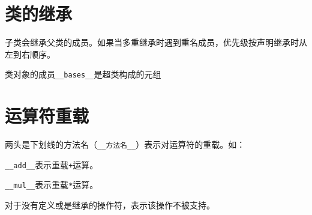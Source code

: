 		

	\section{类的继承}
		
		子类会继承父类的成员。如果当多重继承时遇到重名成员，优先级按声明继承时从左到右顺序。

		类对象的成员\verb|__bases__|是超类构成的元组

		

	\section{运算符重载}

		两头是下划线的方法名（\verb|__方法名__|）表示对运算符的重载。如：
		
		\verb|__add__|表示重载\verb|+|运算。

		\verb|__mul__|表示重载\verb|*|运算。

		对于没有定义或是继承的操作符，表示该操作不被支持。

		

